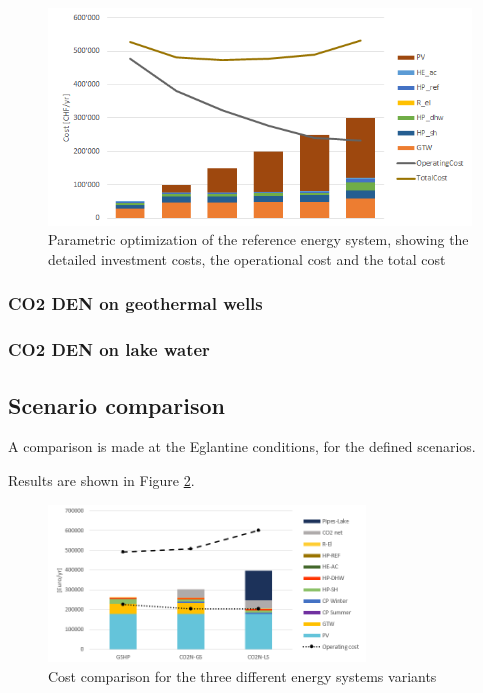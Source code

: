 \documentclass{article}
\begin{document}
\begin{figure}[htp]
	\centering
	\includegraphics[width=1\textwidth]{V_G_PO.png}
	\caption{Parametric optimization of the reference energy system, showing the detailed investment costs, the operational cost and the total cost}
	\label{fig:V_G_PO}
\end{figure}

\subsubsection{CO2 DEN on geothermal wells}



\subsubsection{CO2 DEN on lake water}



\subsection{Scenario comparison}
A comparison is made at the Eglantine conditions, for the defined scenarios.

Results are shown in Figure \ref{fig:V_costs}.\\

\begin{figure}[htp]
	\centering
	\includegraphics[width=0.75\textwidth]{V_costs.PNG}
	\caption{Cost comparison for the three different energy systems variants}
	\label{fig:V_costs}
\end{figure}
\end{document}
